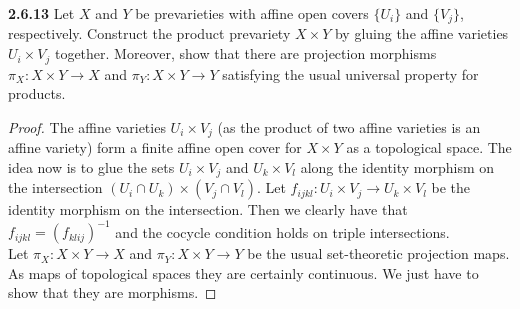 \documentclass[11pt,letterpaper]{report}
\begin{document}
\noindent\textbf{2.6.13}
Let $X$ and $Y$ be prevarieties with affine open covers $\{U_i\}$ and $\{V_j\}$, respectively. Construct the product prevariety $X\times Y$ by gluing the affine varieties $U_i\times V_j$ together. Moreover, show that there are projection morphisms $\pi_X:X\times Y\to X$ and $\pi_Y:X\times Y\to Y$ satisfying the usual universal property for products.
\begin{proof}
	The affine varieties $U_i\times V_j$ (as the product of two affine varieties is an affine variety) form a finite affine open cover for $X\times Y$ as a topological space. The idea now is to glue the sets $U_i\times V_j$ and $U_k\times V_l$ along the identity morphism on the intersection $(U_i\cap U_k)\times (V_j\cap V_l)$. Let $f_{ijkl}:U_i\times V_j\to U_k\times V_l$ be the identity morphism on the intersection. Then we clearly have that $f_{ijkl} = (f_{klij})^{-1}$ and the cocycle condition holds on triple intersections.\\

	\noindent Let $\pi_X:X\times Y\to X$ and $\pi_Y:X\times Y\to Y$ be the usual set-theoretic projection maps. As maps of topological spaces they are certainly continuous. We just have to show that they are morphisms. 
\end{proof}
\end{document}
